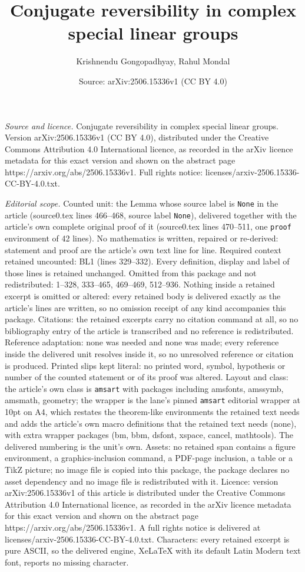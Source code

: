 \documentclass[10pt,a4paper]{amsart}
\title[Conjugate reversibility in complex special linear groups]{Conjugate reversibility in complex special linear groups}
\author{Krishnendu Gongopadhyay, Rahul Mondal}
\date{Source: arXiv:2506.15336v1 (CC BY 4.0)}
\begin{document}
\maketitle

\noindent\emph{Source and licence.} Conjugate reversibility in complex special linear groups. Version arXiv:2506.15336v1 (CC BY 4.0), distributed under the Creative Commons Attribution 4.0 International licence, as recorded in the arXiv licence metadata for this exact version and shown on the abstract page https://arxiv.org/abs/2506.15336v1. Full rights notice: licenses/arxiv-2506.15336-CC-BY-4.0.txt.\par\smallskip

\noindent\textit{Editorial scope.} Counted unit: the Lemma whose source label is \texttt{None} in the article (source0.tex lines 466--468, source label \texttt{None}), delivered together with the article's own complete original proof of it (source0.tex lines 470--511, one \texttt{proof} environment of 42 lines). No mathematics is written, repaired or re-derived: statement and proof are the article's own text line for line. Required context retained uncounted: BL1 (lines 329--332). Every definition, display and label of those lines is retained unchanged. Omitted from this package and not redistributed: 1--328, 333--465, 469--469, 512--936. Nothing inside a retained excerpt is omitted or altered: every retained body is delivered exactly as the article's lines are written, so no omission receipt of any kind accompanies this package. Citations: the retained excerpts carry no citation command at all, so no bibliography entry of the article is transcribed and no reference is redistributed. Reference adaptation: none was needed and none was made; every reference inside the delivered unit resolves inside it, so no unresolved reference or citation is produced. Printed slips kept literal: no printed word, symbol, hypothesis or number of the counted statement or of its proof was altered. Layout and class: the article's own class is \texttt{amsart} with packages including amsfonts, amssymb, amsmath, geometry; the wrapper is the lane's pinned \texttt{amsart} editorial wrapper at 10pt on A4, which restates the theorem-like environments the retained text needs and adds the article's own macro definitions that the retained text needs (none), with extra wrapper packages (bm, bbm, dsfont, xspace, cancel, mathtools). The delivered numbering is the unit's own. Assets: no retained span contains a figure environment, a graphics-inclusion command, a PDF-page inclusion, a table or a TikZ picture; no image file is copied into this package, the package declares no asset dependency and no image file is redistributed with it. Licence: version arXiv:2506.15336v1 of this article is distributed under the Creative Commons Attribution 4.0 International licence, as recorded in the arXiv licence metadata for this exact version and shown on the abstract page https://arxiv.org/abs/2506.15336v1. A full rights notice is delivered at licenses/arxiv-2506.15336-CC-BY-4.0.txt. Characters: every retained excerpt is pure ASCII, so the delivered engine, XeLaTeX with its default Latin Modern text font, reports no missing character.
\end{document}
